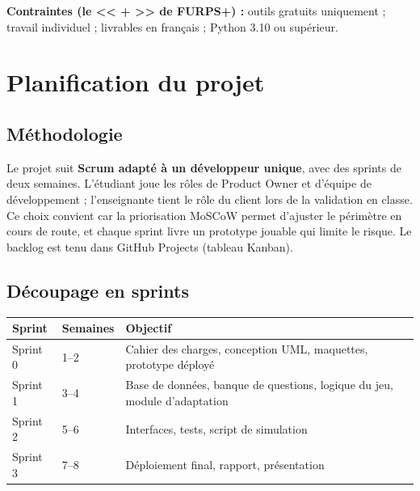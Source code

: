 \documentclass[11pt,a4paper]{article}
\begin{document}
\textbf{Contraintes (le << + >> de FURPS+) :} outils gratuits uniquement ; travail individuel ; livrables en fran\c{c}ais ; Python 3.10 ou sup\'erieur.

\section{Planification du projet}

\subsection{M\'ethodologie}
Le projet suit \textbf{Scrum adapt\'e \`a un d\'eveloppeur unique}, avec des sprints de deux semaines. L'\'etudiant joue les r\^oles de Product Owner et d'\'equipe de d\'eveloppement ; l'enseignante tient le r\^ole du client lors de la validation en classe. Ce choix convient car la priorisation MoSCoW permet d'ajuster le p\'erim\`etre en cours de route, et chaque sprint livre un prototype jouable qui limite le risque. Le backlog est tenu dans GitHub Projects (tableau Kanban).

\subsection{D\'ecoupage en sprints}
\begin{center}
\small
\begin{tabular}{L{2.6cm}L{2.2cm}L{10.4cm}}
\toprule
\textbf{Sprint} & \textbf{Semaines} & \textbf{Objectif}\\
\midrule
Sprint 0 & 1--2 & Cahier des charges, conception UML, maquettes, prototype d\'eploy\'e\\
Sprint 1 & 3--4 & Base de donn\'ees, banque de questions, logique du jeu, module d'adaptation\\
Sprint 2 & 5--6 & Interfaces, tests, script de simulation\\
Sprint 3 & 7--8 & D\'eploiement final, rapport, pr\'esentation\\
\bottomrule
\end{tabular}
\end{center}

\Needspace{11cm}
\end{document}
